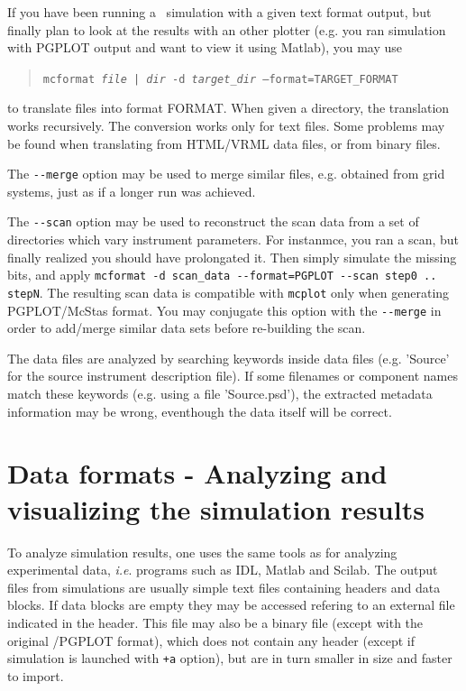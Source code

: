 If you have been running a \MCS\ simulation with a given text format output, but finally plan to look at the results with an other plotter (e.g. you ran simulation with PGPLOT output and want to view it using Matlab), you may use
\begin{quote}
  \texttt{mcformat {\it file | dir} -d {\it target\_dir} --format=TARGET\_FORMAT}
\end{quote}
to translate files into format FORMAT. When given a directory, the translation works recursively. The conversion works only for text files. Some problems may be found when translating from HTML/VRML data files, or from binary files.

The \verb+--merge+ option may be used to merge similar files, e.g. obtained from grid systems, just as if a longer run was achieved.

The \verb+--scan+ option may be used to reconstruct the scan data from a set of directories which vary instrument parameters. For instanmce, you ran a scan, but finally realized you should have prolongated it. Then simply simulate the missing bits, and apply \verb+mcformat -d scan_data --format=PGPLOT --scan step0 .. stepN+. The resulting scan data is compatible with \verb+mcplot+ only when generating PGPLOT/McStas format. You may conjugate this option with the \verb+--merge+ in order to add/merge similar data sets before re-building the scan.

The data files are analyzed by searching keywords inside data files (e.g. 'Source' for the source instrument description file). If some filenames or component names match these keywords (e.g. using a file 'Source.psd'), the extracted metadata information may be wrong, eventhough the data itself will be correct.

\section{Data formats - Analyzing and visualizing the simulation results}
\label{s:analyze}

To analyze simulation results, one uses the same tools as for analyzing
experimental data, \textit{i.e}. programs such as IDL, Matlab and Scilab.
The output files from simulations are usually simple text files containing headers and data blocks. If data blocks are empty they may be accessed refering to an external file indicated in the header. This file may also be a binary file (except with the original \MCS /PGPLOT format), which does not contain any header (except if simulation is launched with \verb|+a| option), but are in turn smaller in size and faster to import.

